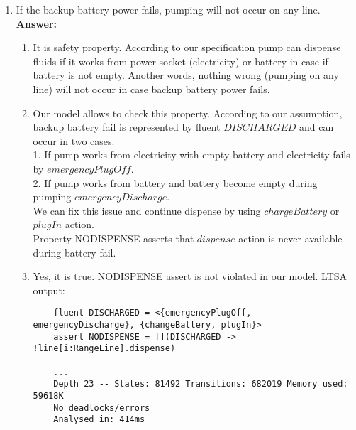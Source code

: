 \documentclass{article}
\begin{document}
\begin{enumerate}
    \item If the backup battery power fails, pumping will not occur on any line.\\
    \textbf{Answer:}
    \begin{enumerate}
    \item It is safety property. According to our specification pump can dispense fluids if it works from power
    socket (electricity) or battery in case if battery is not empty. Another words, nothing wrong (pumping on any line) will
    not occur in case backup battery power fails.
 
    \item Our model allows to check this property. According to our assumption, backup battery fail is represented by fluent
    $DISCHARGED$ and can occur in two cases:\\
    1. If pump works from electricity with empty battery and electricity fails by $emergencyPlugOff$. \\
    2. If pump works from battery and battery become empty during pumping $emergencyDischarge$. \\
    We can fix this issue and continue dispense by using $chargeBattery$ or $plugIn$ action.\\
    Property NODISPENSE asserts that $dispense$ action is never available during battery fail.
    
    \item  Yes, it is true. NODISPENSE assert is not violated in our model. LTSA output:
    \begin{verbatim}
    fluent DISCHARGED = <{emergencyPlugOff, emergencyDischarge}, {changeBattery, plugIn}>
    assert NODISPENSE = [](DISCHARGED -> !line[i:RangeLine].dispense)
    ______________________________________________________
    ...
    Depth 23 -- States: 81492 Transitions: 682019 Memory used: 59618K
    No deadlocks/errors
    Analysed in: 414ms
    \end{verbatim} 
    \end{enumerate}    
    

\end{enumerate}
\end{document}
